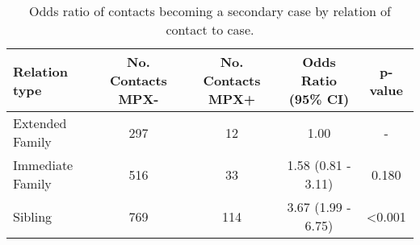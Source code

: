       
\begin{table}
\centering
    \caption{Odds ratio of contacts becoming a secondary case by relation of contact to case. }
    \begin{tabular}{@{}lcccc@{}}
    \toprule
    Relation type & No. Contacts MPX- & No. Contacts MPX+ & Odds Ratio (95\% CI) & p-value \\
    \cmidrule
    
  Extended Family    &   297   &    12 & 1.00  &  - \\
  Immediate Family   &   516    &   33 & 1.58 (0.81 - 3.11) & 0.180 \\
  Sibling             &  769  &    114 &  3.67 (1.99 - 6.75) & \textless0.001 \\

    \bottomrule
    \end{tabular}
    \label{table2}
\end{table}


